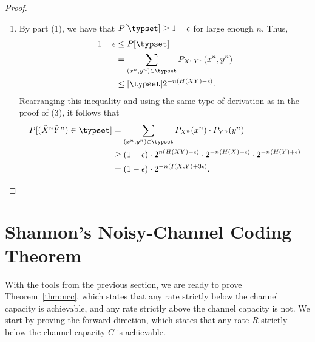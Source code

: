 \begin{proof}
\begin{enumerate}
\begin{align}
\end{align}
Combining this with part (2) of this theorem, we get
\begin{align}
P[(\tilde{X}^n\tilde{Y}^n) \in \typset] &\leq 2^{n(H(XY) + \epsilon)} \cdot 2^{-n(H(X) - \epsilon)} \cdot 2^{-n(H(Y)-\epsilon)}\nonumber\\
&= 2^{-n(-H(XY) + H(X) + H(Y) -3\epsilon)}\nonumber\\
&= 2^{-n(I(X;Y) - 3\epsilon)}.
\end{align}
This completes the proof of the third part.
\item By part (1), we have that $P[\typset] \geq 1 - \epsilon$ for large enough $n$. Thus,
\begin{align}
1-\epsilon &\leq P[\typset]\nonumber\\
&= \sum_{(x^n,y^n) \in \typset} P_{X^nY^n}(x^n,y^n)\nonumber\\
&\leq |\typset| 2^{-n(H(XY) - \epsilon)}.
\end{align}
Rearranging this inequality and using the same type of derivation as in the proof of (3), it follows that
\begin{align}
P[(\tilde{X}^n\tilde{Y}^n) \in \typset]
&= \sum_{(x^n,y^n) \in \typset} P_{X^n}(x^n) \cdot P_{Y^n}(y^n)\nonumber\\
&\geq (1-\epsilon) \cdot 2^{n(H(XY) - \epsilon)} \cdot 2^{-n(H(X) + \epsilon)} \cdot 2^{-n(H(Y) + \epsilon)}\nonumber\\
&= (1 - \epsilon) \cdot 2^{-n(I(X;Y) + 3\epsilon)}.
\end{align}
\end{enumerate}
\end{proof}

\section{Shannon's Noisy-Channel Coding Theorem}
With the tools from the previous section, we are ready to prove Theorem~\ref{thm:ncc}, which states that any rate strictly below the channel capacity is achievable, and any rate strictly above the channel capacity is not. We start by proving the forward direction, which states that any rate $R$ strictly below the channel capacity $C$ is achievable.



